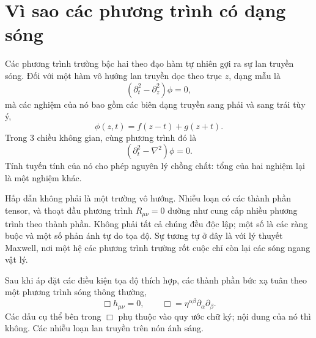 \begin{classroomqa}
\end{classroomqa}

\section{Vì sao các phương trình có dạng sóng}

Các phương trình trường bậc hai theo đạo hàm tự nhiên gợi ra sự lan truyền sóng. Đối với một hàm vô hướng lan truyền dọc theo trục \(z\), dạng mẫu là
\begin{equation}
 \left(\partial_t^2-\partial_z^2\right)\phi=0,
\end{equation}
mà các nghiệm của nó bao gồm các biên dạng truyền sang phải và sang trái tùy ý,
\begin{equation}
 \phi(z,t)=f(z-t)+g(z+t).
\end{equation}
Trong 3 chiều không gian, cùng phương trình đó là
\begin{equation}
 \left(\partial_t^2-\nabla^2\right)\phi=0.
\end{equation}
Tính tuyến tính của nó cho phép nguyên lý chồng chất: tổng của hai nghiệm lại là một nghiệm khác.

Hấp dẫn không phải là một trường vô hướng. Nhiễu loạn có các thành phần tensor, và thoạt đầu phương trình \(R_{\mu\nu}=0\) dường như cung cấp nhiều phương trình theo thành phần. Không phải tất cả chúng đều độc lập; một số là các ràng buộc và một số phản ánh tự do tọa độ. Sự tương tự ở đây là với lý thuyết Maxwell, nơi một hệ các phương trình trường rốt cuộc chỉ còn lại các sóng ngang vật lý.

Sau khi áp đặt các điều kiện tọa độ thích hợp, các thành phần bức xạ tuân theo một phương trình sóng thông thường,
\begin{equation}
 \Box h_{\mu\nu}=0,
 \qquad
 \Box=\eta^{\alpha\beta}\partial_\alpha\partial_\beta.
 \label{eq:linear-wave}
\end{equation}
Các dấu cụ thể bên trong \(\Box\) phụ thuộc vào quy ước chữ ký; nội dung của nó thì không. Các nhiễu loạn lan truyền trên nón ánh sáng.

